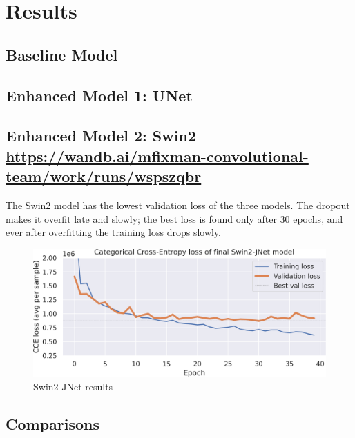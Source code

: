 \section{Results}

\subsection{Baseline Model}

\subsection{Enhanced Model 1: UNet}

\subsection{Enhanced Model 2: Swin2 \\ \scriptsize \url{https://wandb.ai/mfixman-convolutional-team/work/runs/wspszqbr}}

The Swin2 model has the lowest validation loss of the three models.
The dropout makes it overfit late and slowly; the best loss is found only after 30 epochs, and ever after overfitting the training loss drops slowly.

\begin{figure}[h]
	\centering
	\includegraphics[width=.85\textwidth]{swin2_loss.png}
	\caption{Swin2-JNet results}
\end{figure}

\subsection{Comparisons}
